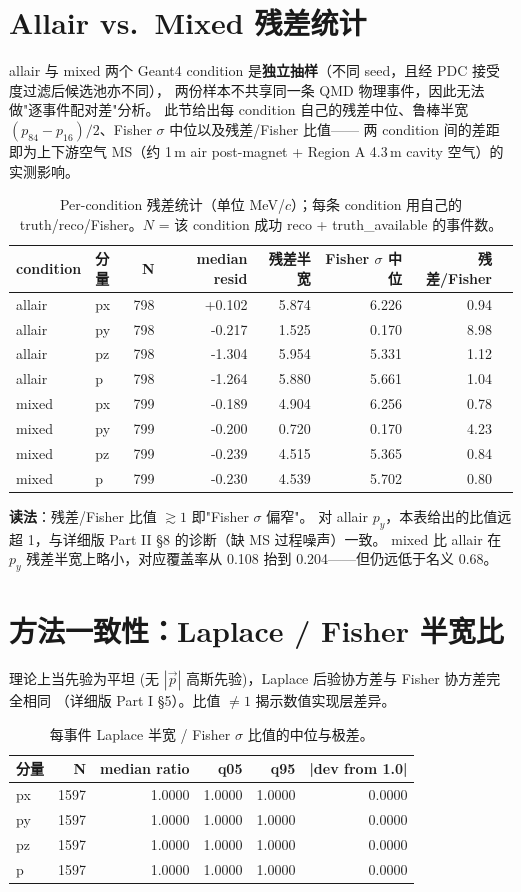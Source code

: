 \documentclass[a4paper,11pt]{article}
\begin{document}
\section{Allair vs.\ Mixed 残差统计}
allair 与 mixed 两个 Geant4 condition 是\textbf{独立抽样}（不同 seed，且经 PDC 接受度过滤后候选池亦不同），
两份样本不共享同一条 QMD 物理事件，因此无法做"逐事件配对差"分析。
此节给出每 condition 自己的残差中位、鲁棒半宽 $(p_{84}-p_{16})/2$、Fisher $\sigma$ 中位以及残差/Fisher 比值——
两 condition 间的差距即为上下游空气 MS（约 1\,m air post-magnet + Region A 4.3\,m cavity 空气）的实测影响。
\begin{table}[H]
\centering\footnotesize
\caption{Per-condition 残差统计（单位 MeV/$c$）；每条 condition 用自己的 truth/reco/Fisher。$N$ = 该 condition 成功 reco + truth\_available 的事件数。}
\begin{tabular}{llrrrrrr}
\toprule
condition & 分量 & N & median resid & 残差半宽 & Fisher $\sigma$ 中位 & 残差/Fisher \\
\midrule
allair & px & 798 & +0.102 & 5.874 & 6.226 & 0.94 \\
allair & py & 798 & -0.217 & 1.525 & 0.170 & 8.98 \\
allair & pz & 798 & -1.304 & 5.954 & 5.331 & 1.12 \\
allair & p & 798 & -1.264 & 5.880 & 5.661 & 1.04 \\
mixed & px & 799 & -0.189 & 4.904 & 6.256 & 0.78 \\
mixed & py & 799 & -0.200 & 0.720 & 0.170 & 4.23 \\
mixed & pz & 799 & -0.239 & 4.515 & 5.365 & 0.84 \\
mixed & p & 799 & -0.230 & 4.539 & 5.702 & 0.80 \\
\bottomrule
\end{tabular}
\end{table}

\textbf{读法}：残差/Fisher 比值 $\gtrsim 1$ 即"Fisher $\sigma$ 偏窄"。
对 allair $p_y$，本表给出的比值远超 1，与详细版 Part II §8 的诊断（缺 MS 过程噪声）一致。
mixed 比 allair 在 $p_y$ 残差半宽上略小，对应覆盖率从 0.108 抬到 0.204——但仍远低于名义 0.68。
\section{方法一致性：Laplace / Fisher 半宽比}
理论上当先验为平坦 (无 $|\vec p|$ 高斯先验)，Laplace 后验协方差与 Fisher 协方差完全相同
（详细版 Part I §5）。比值 $\neq 1$ 揭示数值实现层差异。
\begin{table}[H]
\centering\footnotesize
\caption{每事件 Laplace 半宽 / Fisher $\sigma$ 比值的中位与极差。}
\begin{tabular}{lrrrrr}
\toprule
分量 & N & median ratio & q05 & q95 & |dev from 1.0| \\
\midrule
px & 1597 & 1.0000 & 1.0000 & 1.0000 & 0.0000 \\
py & 1597 & 1.0000 & 1.0000 & 1.0000 & 0.0000 \\
pz & 1597 & 1.0000 & 1.0000 & 1.0000 & 0.0000 \\
p & 1597 & 1.0000 & 1.0000 & 1.0000 & 0.0000 \\
\bottomrule
\end{tabular}
\end{table}
\end{document}
